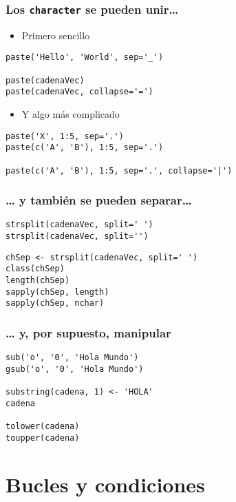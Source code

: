 \documentclass[xcolor={usenames,svgnames,dvipsnames}]{beamer}
\begin{document}
\begin{frame}[fragile]
\frametitle{Los \texttt{character} se pueden unir\ldots{}}
\label{sec-5-3-4}

\begin{itemize}
\item Primero sencillo
\end{itemize}

\lstset{language=R}
\begin{lstlisting}
paste('Hello', 'World', sep='_')

paste(cadenaVec)
paste(cadenaVec, collapse='=')
\end{lstlisting}
\begin{itemize}
\item Y algo más complicado
\end{itemize}

\lstset{language=R}
\begin{lstlisting}
paste('X', 1:5, sep='.')
paste(c('A', 'B'), 1:5, sep='.')

paste(c('A', 'B'), 1:5, sep='.', collapse='|')
\end{lstlisting}
\end{frame}
\begin{frame}[fragile]
\frametitle{\ldots{} y también se pueden separar\ldots{}}
\label{sec-5-3-5}


\lstset{language=R}
\begin{lstlisting}
strsplit(cadenaVec, split=' ')
strsplit(cadenaVec, split='')
\end{lstlisting}


\lstset{language=R}
\begin{lstlisting}
chSep <- strsplit(cadenaVec, split=' ')
class(chSep)
length(chSep)
sapply(chSep, length)
sapply(chSep, nchar)
\end{lstlisting}
\end{frame}
\begin{frame}[fragile]
\frametitle{\ldots{} y, por supuesto, manipular}
\label{sec-5-3-6}


\lstset{language=R}
\begin{lstlisting}
sub('o', '0', 'Hola Mundo')
gsub('o', '0', 'Hola Mundo')

substring(cadena, 1) <- 'HOLA'
cadena

tolower(cadena)
toupper(cadena)
\end{lstlisting}
\end{frame}
\section{Bucles y condiciones}
\label{sec-6}
\end{document}
